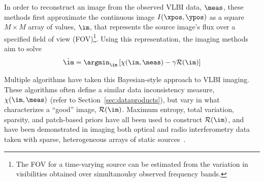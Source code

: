 In order to reconstruct an image from the observed VLBI data, $\meas$, 
these methods first approximate the continuous image $I(\xpos, \ypos)$ as a square $M \times M$ array of values, $\im$, that represents the source image's flux over a specified field of view (FOV)\footnote{The FOV for a time-varying source can be estimated from the variation in visibilities obtained over simultanoulsy observed frequency bands. }. Using this representation, the imaging methods aim to solve %
\begin{align}
\hat{\im} = \argmin_{\im} \left[ \chi(\im,\meas) - \gamma \mathcal{R}(\im) \right]
\label{eq:setup}
\end{align}


Multiple algorithms have taken this Bayesian-style approach to VLBI imaging. These algorithms often define a similar data inconsistency measure, $\chi(\im, \meas)$ (refer to Section~\ref{sec:dataproducts}), but vary in what characterizes a ``good'' image, $\mathcal{R}(\im)$. Maximum entropy, total variation, sparsity, and patch-based priors have all been used to construct $\mathcal{R}(\im)$, and have been demonstrated in imaging both optical and radio interferometry data taken with sparse, heterogeneous arrays of static sources~\cite{bouman2016computational, andrew, Fish_2016_Imaging, baron2010novel, buscher1994direct, Suksmono, lofar}. 

